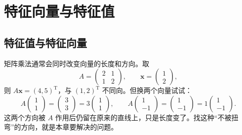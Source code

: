 \section{特征向量与特征值}

\subsection{特征值与特征向量}

矩阵乘法通常会同时改变向量的长度和方向。取
\[
A=\begin{pmatrix}2&1\\1&2\end{pmatrix},\qquad
\mathbf{x}=\begin{pmatrix}1\\2\end{pmatrix},
\]
则 \(A\mathbf{x}=(4,5)^{\mathrm{T}}\)，与 \((1,2)^{\mathrm{T}}\) 不同向。但换两个向量试试：
\[
A\begin{pmatrix}1\\1\end{pmatrix}=\begin{pmatrix}3\\3\end{pmatrix}=3\begin{pmatrix}1\\1\end{pmatrix},
\qquad
A\begin{pmatrix}1\\-1\end{pmatrix}=\begin{pmatrix}1\\-1\end{pmatrix}=1\begin{pmatrix}1\\-1\end{pmatrix}.
\]
这两个方向被 \(A\) 作用后仍留在原来的直线上，只是长度变了。找这种“不被扭弯”的方向，就是本章要解决的问题。

